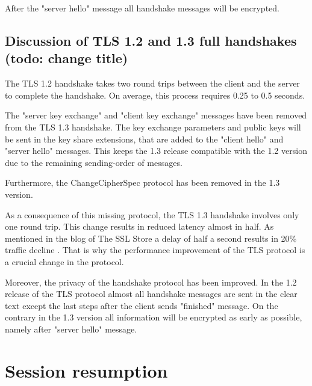 After the "server hello" message all handshake messages will be encrypted.
\cite{recorla}
\subsection{Discussion of TLS 1.2 and 1.3 full handshakes (todo: change title)}
\label{subsec:comparison_handshake}

The TLS 1.2 handshake takes two round trips between the client and the server to complete the handshake. On average, this process requires 0.25 to 0.5 seconds.

The "server key exchange" and "client key exchange" messages have been removed from the TLS 1.3 handshake. The key exchange parameters and public keys will be sent in the key share extensions, that are added to the "client hello" and "server hello" messages. This keeps the 1.3 release compatible with the 1.2 version due to the remaining sending-order of messages.

Furthermore, the ChangeCipherSpec protocol has been removed in the 1.3 version. 

As a consequence of this missing protocol, the TLS 1.3 handshake involves only one round trip. This change results in reduced latency almost in half. As mentioned in the blog of The SSL Store a delay of half a second results in 20\% traffic decline \cite{sslstore:handshake}. That is why the performance improvement of the TLS protocol is a crucial change in the protocol.

Moreover, the privacy of the handshake protocol has been improved. In the 1.2 release of the TLS protocol almost all handshake messages are sent in the clear text except the last steps after the client sends "finished" message. On the contrary in the 1.3 version all information will be encrypted as early as possible, namely after "server hello" message. 

\section{Session resumption}
\label{sec:comparison_resumption}

